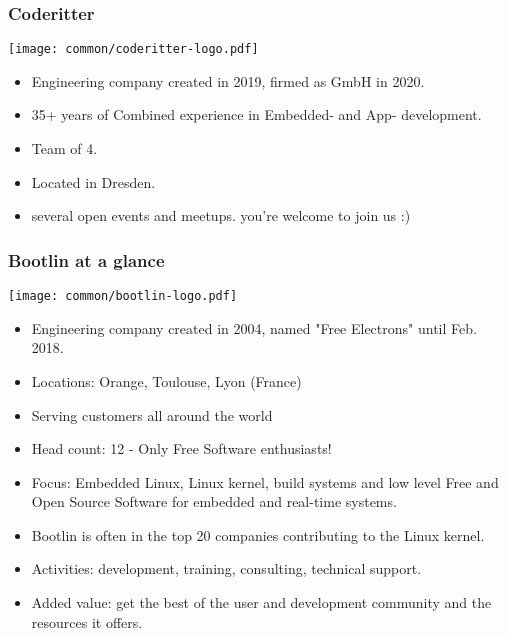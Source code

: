 \begin{frame}
\frametitle{Coderitter}
  \texttt{[image: common/coderitter-logo.pdf]}
  \begin{itemize}
    \item Engineering company created in 2019, firmed as GmbH in 2020.
    \item 35+ years of Combined experience in Embedded- and App- development.
    \item Team of 4.
    \item Located in Dresden.
    \item several open events and meetups. you're welcome to join us :)
  \end{itemize}
\end{frame}

\begin{frame}
 \frametitle{Bootlin at a glance}
  \texttt{[image: common/bootlin-logo.pdf]}
  \begin{itemize}
    \item Engineering company created in 2004, named "Free Electrons" until Feb. 2018.
    \item Locations: Orange, Toulouse, Lyon (France)
    \item Serving customers all around the world
    \item Head count: 12 - Only Free Software enthusiasts!
    \item Focus: Embedded Linux, Linux kernel,
          build systems and low level Free and Open Source Software
          for embedded and real-time systems.
    \item Bootlin is often in the top 20 companies
	  contributing to the Linux kernel.
    \item Activities: development, training, consulting, technical
          support.
    \item Added value: get the best of the user and development
          community and the resources it offers.
  \end{itemize}
\end{frame}

